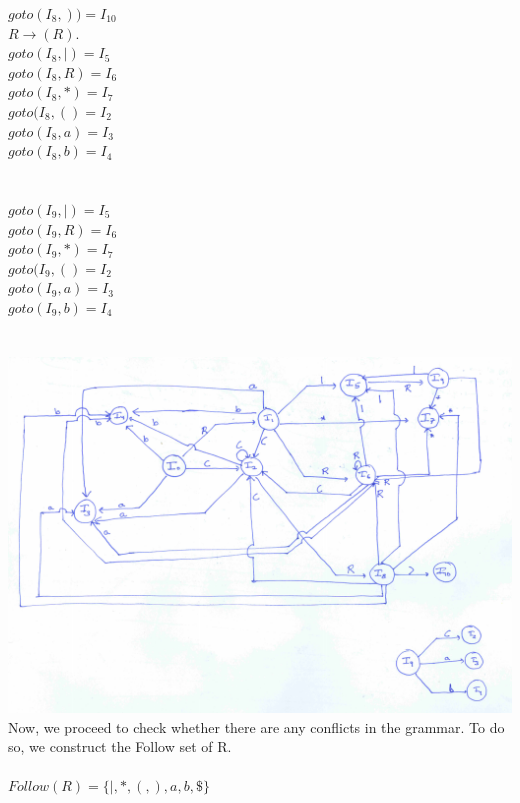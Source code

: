 \documentclass[10pt]{letter}
\begin{document}
\begin{enumerate}
$goto(I_{8},))=I_{10}$\\
$R \rightarrow (R).$\\
$goto(I_{8},|)=I_{5}$\\
$goto(I_{8},R)=I_{6}$\\
$goto(I_{8},*)=I_{7}$\\
$goto(I_{8},()=I_{2}$\\
$goto(I_{8},a)=I_{3}$\\
$goto(I_{8},b)=I_{4}$\\
\\
\\
$goto(I_{9},|)=I_{5}$\\
$goto(I_{9},R)=I_{6}$\\
$goto(I_{9},*)=I_{7}$\\
$goto(I_{9},()=I_{2}$\\
$goto(I_{9},a)=I_{3}$\\
$goto(I_{9},b)=I_{4}$\\
\\
\\
\includegraphics[scale=0.5]{dfa_3}\\
Now, we proceed to check whether there are any conflicts in the grammar. To do so, we construct the Follow set of R.\\
\\
$Follow(R) = \{|,*,(,),a,b,\$\}$\\


\end{enumerate}
\end{document}
